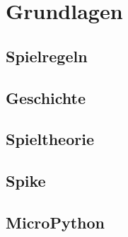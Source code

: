 \chapter{Grundlagen}
\label{cha:Grundlagen}

%
%
\section{Spielregeln}
\section{Geschichte}
\section{Spieltheorie}
\section{Spike}
\section{MicroPython}
